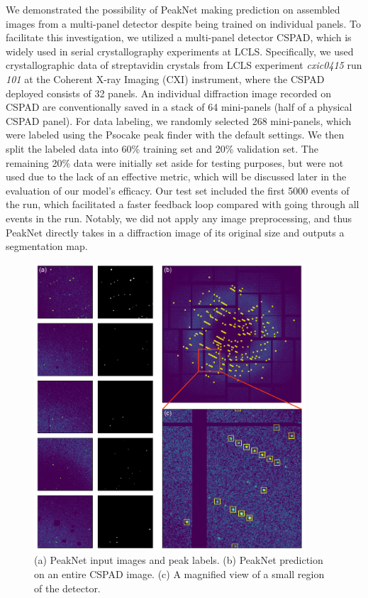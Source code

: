 \documentclass[conference]{IEEEtran}
\newcommand{\peaknet}{PeakNet}
\newcommand{\psocake}{Psocake}
\begin{document}
We demonstrated the possibility of \peaknet{} making prediction on assembled
images from a multi-panel detector despite being trained on individual panels.
To facilitate this investigation, we utilized a multi-panel detector CSPAD,
which is widely used in serial crystallography experiments at LCLS.
Specifically, we used crystallographic data of streptavidin crystals from LCLS
experiment \textit{cxic0415} run \textit{101} at the Coherent X-ray Imaging (CXI)
instrument, where the CSPAD deployed consists of 32 panels.  An individual
diffraction image recorded on CSPAD are conventionally saved in a stack of 64
mini-panels (half of a physical CSPAD panel).  For data labeling, we randomly
selected 268 mini-panels, which were labeled using the \psocake{} peak finder
with the default settings.  We then split the labeled data into 60\% training
set and 20\% validation set.  The remaining 20\% data were initially set aside
for testing purposes, but were not used due to the lack of an effective metric,
which will be discussed later in the evaluation of our model's efficacy.  Our
test set included the first 5000 events of the run, which facilitated a faster
feedback loop compared with going through all events in the run.  Notably, we
did not apply any image preprocessing, and thus \peaknet{} directly takes in a
diffraction image of its original size and outputs a segmentation map.

\begin{figure}[htbp]
\centering
\includegraphics[width=0.9\textwidth,keepaspectratio]
{./figures/label_to_predict_with_zoom.pdf}
\caption{(a) \peaknet{} input images and peak labels.  (b) \peaknet{} prediction
on an entire CSPAD image.  (c) A magnified view of a small region of the
detector.}
\label{fig : label and predict}
\end{figure}
\end{document}
